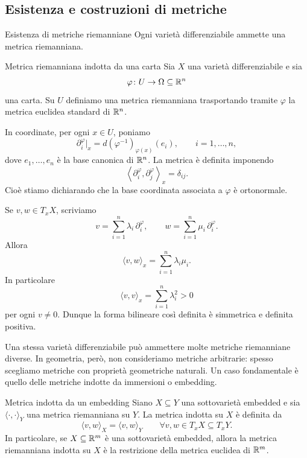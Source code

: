 \documentclass[a4paper]{article}
\begin{document}
\pagebreak

\subsection{Esistenza e costruzioni di metriche}

\begin{snippettheorem}{Esistenza di metriche riemanniane}
Ogni varietà differenziabile ammette una metrica riemanniana.
\end{snippettheorem}

\begin{snippetdefinition}{Metrica riemanniana indotta da una carta}
Sia \(X\) una varietà differenziabile e sia
\[
    \varphi \colon U\to \Omega\subseteq \mathbb{R}^n
\]
una carta. Su \(U\) definiamo una metrica riemanniana trasportando tramite \(\varphi\) la metrica euclidea standard di \(\mathbb{R}^n\).

In coordinate, per ogni \(x\in U\), poniamo
\[
    \partial_i^\varphi\big|_x
    =
    d(\varphi^{-1})_{\varphi(x)}(e_i),
    \qquad
    i=1,\ldots,n,
\]
dove \(e_1,\ldots,e_n\) è la base canonica di \(\mathbb{R}^n\). La metrica è definita imponendo
\[
    \left\langle \partial_i^\varphi,\partial_j^\varphi\right\rangle_x
    =
    \delta_{ij}.
\]
Cioè stiamo dichiarando che la base coordinata associata a \(\varphi\) è ortonormale.
\end{snippetdefinition}

Se \(v,w\in T_xX\), scriviamo
\[
    v=\sum_{i=1}^{n}\lambda_i\,\partial_i^\varphi,
    \qquad
    w=\sum_{i=1}^{n}\mu_i\,\partial_i^\varphi.
\]
Allora
\[
    \langle v,w\rangle_x
    =
    \sum_{i=1}^{n}\lambda_i\mu_i.
\]
In particolare
\[
    \langle v,v\rangle_x
    =
    \sum_{i=1}^{n}\lambda_i^2>0
\]
per ogni \(v\neq0\). Dunque la forma bilineare così definita è simmetrica e definita positiva.

Una stessa varietà differenziabile può ammettere molte metriche riemanniane diverse. In geometria, però, non consideriamo metriche arbitrarie: spesso scegliamo metriche con proprietà geometriche naturali. Un caso fondamentale è quello delle metriche indotte da immersioni o embedding.

\begin{snippetdefinition}{Metrica indotta da un embedding}
Siano \(X\subseteq Y\) una sottovarietà embedded e sia \(\langle\cdot,\cdot\rangle_Y\) una metrica riemanniana su \(Y\). La metrica indotta su \(X\) è definita da
\[
    \langle v,w\rangle_X
    =
    \langle v,w\rangle_Y
    \qquad
    \forall v,w\in T_xX\subseteq T_xY.
\]
In particolare, se \(X\subseteq\mathbb{R}^m\) è una sottovarietà embedded, allora la metrica riemanniana indotta su \(X\) è la restrizione della metrica euclidea di \(\mathbb{R}^m\).
\end{snippetdefinition}
\end{document}
